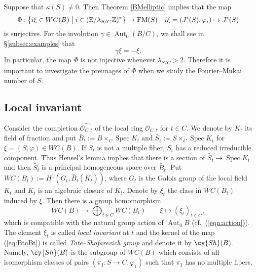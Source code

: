 \documentclass[a4paper,11pt]{article}
\theoremstyle{definition}\newtheorem{defn}[thm]{Definition}
\theoremstyle{remark}\newtheorem{remark}[thm]{Remark}
\numberwithin{equation}{section}
\newcommand{\Aut}{\ensuremath{\operatorname{Aut}}}
\newcommand{\Spec}{\ensuremath{\operatorname{Spec}}}
\newcommand{\wt}{\widetilde}
\newcommand{\FM}{\operatorname{FM}}
\newcommand{\mc}{\mathcal}
\newcommand{\wh}{\widehat}
\newcommand{\Z}{\mathbb Z}
\begin{document}
Suppose that $\kappa (S)\ne 0$. Then
Theorem \ref{BMelliptic} implies that the map 
%
\begin{equation}\label{eq:WCFM} 
\Phi \colon
\bigl\{ i\xi \in WC(B) \bigm| i\in (\Z/\lambda_{S/C}\Z)^* \bigr\}\to \FM (S)
\quad   i\xi=(J^i(S),\varphi_i) \mapsto J^i(S)
\end{equation}
%
is surjective.
For the involution $\gamma\in \Aut_0(B/C)$, 
we shall see in \S \ref{subsec:examples} that 
$$\gamma\xi=-\xi.$$
In particular, the map $\Phi$ is not injective whenever
$\lambda_{S/C}>2$. Therefore it is important to investigate the 
preimages of $\Phi$ when 
we study the Fourier--Mukai number of $S$.
 
%
%  

\subsection{Local invariant}\label{subsec:local}

Consider the completion $\wh{\mc O_{C,t}}$ of the local ring $\mc O_{C,t}$ for $t\in C$.
 We denote by $K_t$ its field of fraction and put $\wt{B_t}:=B\times_C \Spec K_t$
and $\wt{S_t}:=S\times_C \Spec K_t$ for $\xi=(S,\varphi)\in WC(B)$.
If $S_t$ is not a multiple fiber, $S_t$ has a reduced irreducible component. Thus
Hensel's lemma implies that there is a section of 
$\wt{S_t} \to \Spec K_t$ and then $\wt{S_t}$ 
is a principal homogeneous
space over $\wt{B_t}$. Put $WC(B_t):=H^1(G_t,\wt{B_t}(\overline{K_t}))$, where
$G_t$ is the Galois group of the local field $K_t$ and $\overline{K_t}$ is an 
algebraic closure of ${K_t}$.
 Denote 
by $\xi_t$ the class in $WC (B_t)$ induced by $\xi$.
Then
there is a group homomorphism 
%
\begin{equation}\label{eq:BtoBt}
WC(B) \to \bigoplus _{t\in C} WC(B_t) \qquad \xi\mapsto (\xi _t)_{t\in C},
\end{equation}
which is compatible with the natural group action of $\Aut_0 B$ (cf.~(\ref{eqn:action})).
The element $\xi_t$ is called \emph{local invariant} at $t$ and  
the kernel of the map (\ref{eq:BtoBt}) is called  \emph{Tate--Shafarevich group}
and denote it by $\cy{Sh}(B)$. Namely,
$\cy{Sh}(B)$ is the subgroup of $WC(B)$ 
which consists of all isomorphism classes of pairs 
$(\pi_1\colon S\to C,\varphi_1)$ such that 
$\pi_1$ has no multiple fibers. 
\end{document}
